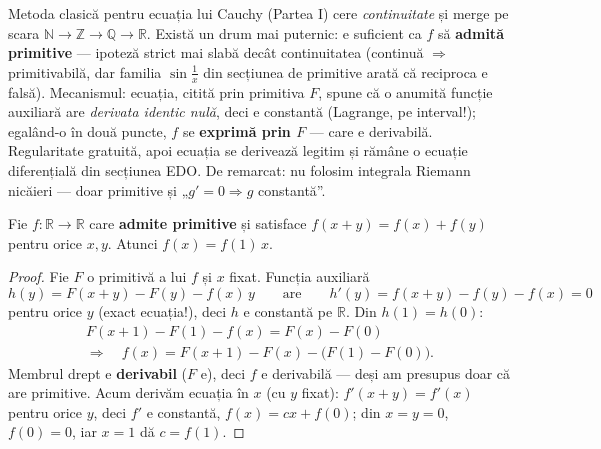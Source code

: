 Metoda clasică pentru ecuația lui Cauchy (Partea I) cere \emph{continuitate} și merge pe scara $\mathbb{N}\to\mathbb{Z}\to\mathbb{Q}\to\mathbb{R}$. Există un drum mai puternic: e suficient ca $f$ să \textbf{admită primitive} --- ipoteză strict mai slabă decât continuitatea (continuă $\Rightarrow$ primitivabilă, dar familia $\sin\frac1x$ din secțiunea de primitive arată că reciproca e falsă). Mecanismul: ecuația, citită prin primitiva $F$, spune că o anumită funcție auxiliară are \emph{derivata identic nulă}, deci e constantă (Lagrange, pe interval!); egalând-o în două puncte, $f$ se \textbf{exprimă prin $F$} --- care e derivabilă. Regularitate gratuită, apoi ecuația se derivează legitim și rămâne o ecuație diferențială din secțiunea EDO. De remarcat: nu folosim integrala Riemann nicăieri --- doar primitive și „$g'=0\Rightarrow g$ constantă''.

\begin{teorema}
Fie $f:\mathbb{R}\to\mathbb{R}$ care \textbf{admite primitive} și satisface $f(x+y)=f(x)+f(y)$ pentru orice $x,y$. Atunci $f(x)=f(1)\,x$.
\end{teorema}
\begin{proof}
Fie $F$ o primitivă a lui $f$ și $x$ fixat. Funcția auxiliară
\[
h(y)=F(x+y)-F(y)-f(x)\,y
\qquad\text{are}\qquad
h'(y)=f(x+y)-f(y)-f(x)=0
\]
pentru orice $y$ (exact ecuația!), deci $h$ e constantă pe $\mathbb{R}$. Din $h(1)=h(0)$:
\[
\begin{gathered}
F(x+1)-F(1)-f(x)=F(x)-F(0)\\
\Longrightarrow\quad
f(x)=F(x+1)-F(x)-\big(F(1)-F(0)\big).
\end{gathered}
\]
Membrul drept e \textbf{derivabil} ($F$ e), deci $f$ e derivabilă --- deși am presupus doar că are primitive. Acum derivăm ecuația în $x$ (cu $y$ fixat): $f'(x+y)=f'(x)$ pentru orice $y$, deci $f'$ e constantă, $f(x)=cx+f(0)$; din $x=y=0$, $f(0)=0$, iar $x=1$ dă $c=f(1)$.
\end{proof}

